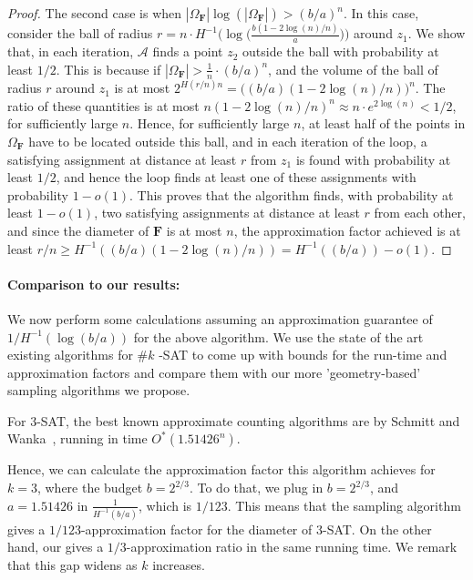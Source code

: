 \documentclass[11pt, letterpaper]{article}
\theoremstyle{definition}
\newcommand{\alg}{\mathcal{A}}
\newcommand{\f}{\mathbf{F}}
\newcommand{\Om}{\Omega_{\f}}
\begin{document}
\begin{proof}
The second case is when $|\Om| \log(|\Om|) > (b/a)^n$. In this case, consider the ball of radius $r=n \cdot  H^{-1}\big(\log\big(\frac{b(1-2\log(n)/n)}{a}\big)\big)$ around $z_1$. We show that, in each iteration, $\alg$ finds a point $z_2$ outside the ball with probability at least $1/2$. This is because if $|\Om| > \frac{1}{n} \cdot (b/a)^n$, and the volume of the ball of radius $r$ around $z_1$ is at most $2^{H(r/n)n}=\big( (b/a) (1-2 \log(n)/n)\big)^n$. The ratio of these quantities is at most $n(1-2\log(n)/n)^n \approx n \cdot e^{2 \log(n)} <1/2 $, for sufficiently large $n$. Hence, for sufficiently large $n$, at least half of the points in $\Om$ have to be located outside this ball, and in each iteration of the loop, a satisfying assignment at distance at least $r$ from $z_1$ is found with probability at least $1/2$, and hence the loop finds at least one of these assignments with probability $1-o(1)$. This proves that the algorithm finds, with probability at least $1-o(1)$, two satisfying assignments at distance at least $r$ from each other, and since the diameter of $\f$ is at most $n$, the approximation factor achieved is at least $r/n \geq H^{-1}((b/a) (1-2 \log(n)/n)) = H^{-1}((b/a))-o(1)$.
\end{proof}

\paragraph{Comparison to our results:} We now perform some calculations assuming an approximation guarantee of $1/H^{-1}(\log(b/a))$ for the above algorithm. We use the state of the art existing algorithms for $ \#k $ -SAT to come up with bounds for the run-time and approximation factors and compare them with our more 'geometry-based' sampling algorithms we propose. 

For $3$-SAT, the best known approximate counting algorithms are by Schmitt and Wanka~\cite{schmitt2013exploiting}, running in time $O^*(1.51426^n)$. 

Hence, we can calculate the approximation factor this algorithm achieves for $k=3$, where the budget $b=2^{2/3}$. To do that, we plug in $b=2^{2/3}$, and $a=1.51426$ in $\frac{1}{H^{-1}(b/a)}$, which is $1/123$. This means that the sampling algorithm gives a $1/123$-approximation factor for the diameter of $3$-SAT. On the other hand, our  gives a $1/3$-approximation ratio in the same running time. We remark that this gap widens as $k$ increases. 
\end{document}
